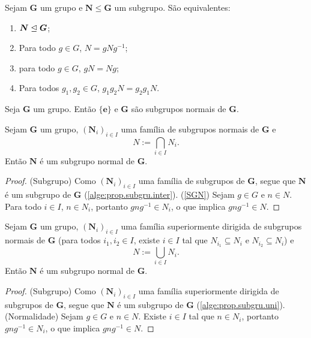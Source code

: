 \begin{proposition}
Sejam $\bm G$ um grupo e $\bm N \leq \bm G$ um subgrupo. São equivalentes:
	\begin{enumerate}
	\item $\bm N \mathrel{\unlhd} \bm G$;
	\item Para todo $g \in G$, $N=gNg^{-1}$;
	\item para todo $g \in G$, $gN=Ng$;
	\item Para todos $g_1,g_2 \in G$, $g_1g_2N = g_2g_1N$.
	\end{enumerate}
\end{proposition}

\begin{proposition}
\label{alge:prop.subgrunor.triv}
Seja $\bm G$ um grupo. Então $\bm{\{e\}}$ e $\bm G$ são subgrupos normais de $\bm G$.
\end{proposition}

\begin{proposition}
\label{alge:prop.subgrunor.inter}
Sejam $\bm G$ um grupo, $(\bm N_i)_{i \in I}$ uma família de subgrupos normais de $\bm G$ e
	\begin{equation*}
	N := \bigcap_{i \in I} N_i.
	\end{equation*}
Então $\bm N$ é um subgrupo normal de $\bm G$.
\end{proposition}
\begin{proof}
(Subgrupo) Como $(\bm N_i)_{i \in I}$ uma família de subgrupos de $\bm G$, segue que $\bm N$ é um subgrupo de $\bm G$ (\ref{alge:prop.subgru.inter}).
(\ref{SGN}) Sejam $g \in G$ e $n \in N$. Para todo $i \in I$, $n \in N_i$, portanto $gng^{-1} \in N_i$, o que implica $gng^{-1} \in N$.
\end{proof}

\begin{proposition}
\label{alge:prop.subgrunor.uni}
Sejam $\bm G$ um grupo, $(\bm N_i)_{i \in I}$ uma família superiormente dirigida de subgrupos normais de $\bm G$ (para todos $i_1,i_2 \in I$, existe $i \in I$ tal que $N_{i_1} \subseteq N_i$ e $N_{i_2} \subseteq N_i$) e
	\begin{equation*}
	N := \bigcup_{i \in I} N_i.
	\end{equation*}
Então $\bm N$ é um subgrupo normal de $\bm G$.
\end{proposition}
\begin{proof}
(Subgrupo) Como $(\bm N_i)_{i \in I}$ uma família superiormente dirigida de subgrupos de $\bm G$, segue que $\bm N$ é um subgrupo de $\bm G$ (\ref{alge:prop.subgru.uni}).
(Normalidade) Sejam $g \in G$ e $n \in N$. Existe $i \in I$ tal que $n \in N_i$, portanto $gng^{-1} \in N_i$, o que implica $gng^{-1} \in N$.
\end{proof}

